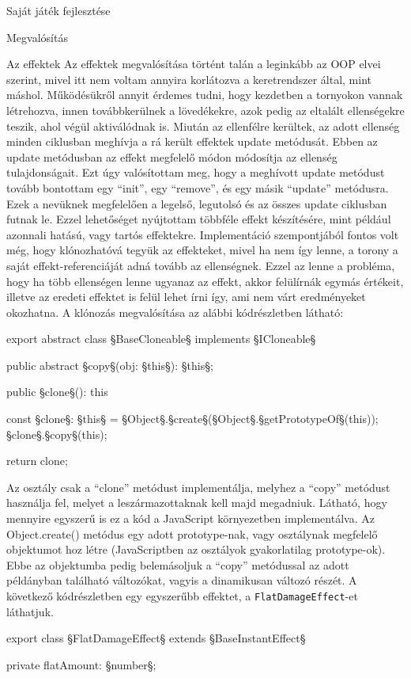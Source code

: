 \begin{MyChapter}{Saját játék fejlesztése}
\begin{MySection}{Megvalósítás}
		\begin{MySubSection}{Az effektek}
			Az effektek megvalósítása történt talán a leginkább az OOP elvei szerint, mivel itt nem voltam annyira korlátozva a keretrendszer által, mint máshol. Működésükről annyit érdemes tudni, hogy kezdetben a tornyokon vannak létrehozva, innen továbbkerülnek a lövedékekre, azok pedig az eltalált ellenségekre teszik, ahol végül aktiválódnak is. Miután az ellenfélre kerültek, az adott ellenség minden ciklusban meghívja a rá került effektek update metódusát. Ebben az update metódusban az effekt megfelelő módon módosítja az ellenség tulajdonságait. Ezt úgy valósítottam meg, hogy a meghívott update metódust tovább bontottam egy ``init'', egy ``remove'', és egy másik ``update'' metódusra. Ezek a nevüknek megfelelően a legelső, legutolsó és az összes update ciklusban futnak le. Ezzel lehetőséget nyújtottam többféle effekt készítésére, mint például azonnali hatású, vagy tartós effektekre.
			Implementáció szempontjából fontos volt még, hogy klónozhatóvá tegyük az effekteket, mivel ha nem így lenne, a torony a saját effekt-referenciáját adná tovább az ellenségnek. Ezzel az lenne a probléma, hogy ha több ellenségen lenne ugyanaz az effekt, akkor felülírnák egymás értékeit, illetve az eredeti effektet is felül lehet írni így, ami nem várt eredményeket okozhatna. A klónozás megvalósítása az alábbi kódrészletben látható:
			\begin{javascript}
export abstract class §\color{jsType}BaseCloneable§ implements §\color{jsType}ICloneable§ {
	public abstract §\color{jsMethod}copy§(obj: §\color{jsType}this§): §\color{jsType}this§;
	
	public §\color{jsMethod}clone§(): this {
		const §\color{jsConst}clone§: §\color{jsType}this§ = §\color{jsType}Object§.§\color{jsMethod}create§(§\color{jsType}Object§.§\color{jsMethod}getPrototypeOf§(this));
		§\color{jsConst}clone§.§\color{jsMethod}copy§(this);
		
		return clone;
	}
}
			\end{javascript}
			Az osztály csak a ``clone'' metódust implementálja, melyhez a ``copy'' metódust használja fel, melyet a leszármazottaknak kell majd megadniuk. Látható, hogy mennyire egyszerű is ez a kód a JavaScript környezetben implementálva. Az Object.create() metódus egy adott prototype-nak, vagy osztálynak megfelelő objektumot hoz létre (JavaScriptben az osztályok gyakorlatilag prototype-ok). Ebbe az objektumba pedig belemásoljuk a ``copy'' metódussal az adott példányban található változókat, vagyis a dinamikusan változó részét.
			A következő kódrészletben egy egyszerűbb effektet, a \texttt{FlatDamageEffect}-et láthatjuk. 
			\begin{javascript}
export class §\color{jsType}FlatDamageEffect§ extends §\color{jsType}BaseInstantEffect§ {
	private flatAmount: §\color{jsType}number§;
	
}
\end{javascript}
\end{MySubSection}
\end{MySection}
\end{MyChapter}
